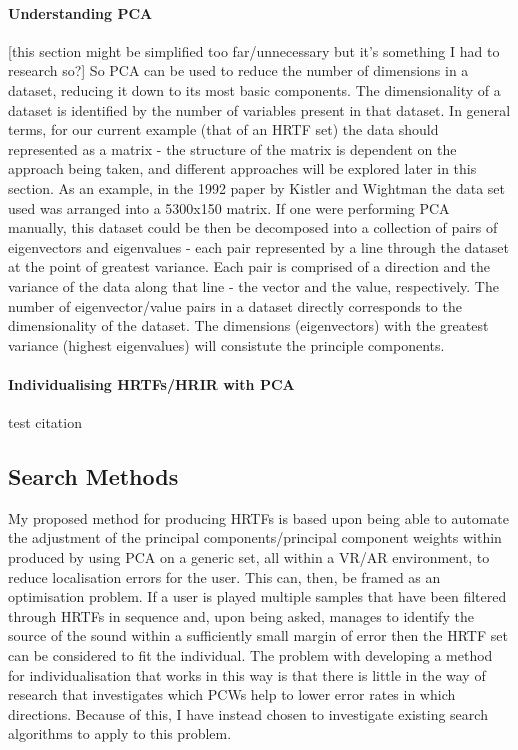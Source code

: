 \paragraph{Understanding PCA}
[this section might be simplified too far/unnecessary but it's something I had to research so?]
So PCA can be used to reduce the number of dimensions in a dataset, reducing it down to its most basic components. The dimensionality of a dataset is identified by the number of variables present in that dataset. In general terms, for our current example (that of an HRTF set) the data should represented as a matrix - the structure of the matrix is dependent on the approach being taken, and different approaches will be explored later in this section. As an example, in the 1992 paper by Kistler and Wightman \citep{Kistler1992} the data set used was arranged into a 5300x150 matrix. If one were performing PCA manually, this dataset could be then be decomposed into a collection of pairs of eigenvectors and eigenvalues - each pair represented by a line through the dataset at the point of greatest variance. Each pair is comprised of a direction and the variance of the data along that line - the vector and the value, respectively. The number of eigenvector/value pairs in a dataset directly corresponds to the dimensionality of the dataset. The dimensions (eigenvectors) with the greatest variance (highest eigenvalues) will consistute the principle components. 


\paragraph{Individualising HRTFs/HRIR with PCA}
test citation \citep{Holzl2012a}

\subsection{Search Methods}
My proposed method for producing HRTFs is based upon being able to automate the adjustment of the principal components/principal component weights within produced by using PCA on a generic set, all within a VR/AR environment, to reduce localisation errors for the user. This can, then, be framed as an optimisation problem. If a user is played multiple samples that have been filtered through HRTFs in sequence and, upon being asked, manages to identify the source of the sound within a sufficiently small margin of error then the HRTF set can be considered to fit the individual. The problem with developing a method for individualisation that works in this way is that there is little in the way of research that investigates which PCWs help to lower error rates in which directions. Because of this, I have instead chosen to investigate existing search algorithms to apply to this problem. 

